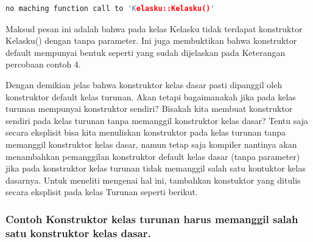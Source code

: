 \begin{lstlisting}[language=c++, numbers=none]
no maching function call to 'Kelasku::Kelasku()'
\end{lstlisting}

Maksud pesan ini adalah bahwa pada kelas Kelasku tidak terdapat
konstruktor Kelasku() dengan tanpa parameter. Ini juga membuktikan bahwa
konstruktor default mempunyai bentuk seperti yang sudah dijelaskan pada
Keterangan percobaan contoh 4.

Dengan demikian jelas bahwa konstruktor kelas dasar pasti dipanggil oleh
konstruktor default kelas turunan. Akan tetapi bagaimanakah jika pada
kelas turunan mempunyai konstruktor sendiri? Bisakah kita membuat
konstruktor sendiri pada kelas turunan tanpa memanggil konstruktor kelas
dasar? Tentu saja secara eksplisit bisa kita menuliskan konstruktor pada
kelas turunan tanpa memanggil konstruktor kelas dasar, namun tetap saja
kompiler nantinya akan menambahkan pemanggilan konstruktor default kelas
dasar (tanpa parameter) jika pada konstruktor kelas turunan tidak
memanggil salah satu kontuktor kelas dasarnya. Untuk meneliti mengenai
hal ini, tambahkan konstuktor yang ditulis secara eksplisit pada kelas
Turunan seperti berikut.

\subsubsection*{Contoh Konstruktor kelas turunan harus memanggil salah satu konstruktor kelas dasar.}

